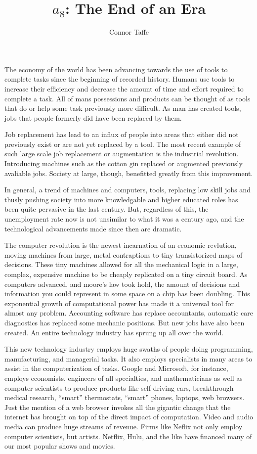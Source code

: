 \documentclass{amsart}
\title{$a_{8}$: The End of an Era}
\author{Connor Taffe}
\begin{document}
  \maketitle

  The economy of the world has been advancing towards the use of tools to complete tasks since the beginning of recorded history. Humans use tools to increase their efficiency and decrease the amount of time and effort required to complete a task. All of mans possessions and products can be thought of as tools that do or help some task previously more difficult. As man has created tools, jobs that people formerly did have been replaced by them.

  Job replacement has lead to an influx of people into areas that either did not previously exist or are not yet replaced by a tool. The most recent example of such large scale job replacement or augmentation is the industrial revolution. Introducing machines such as the cotton gin replaced or augmented previously avaliable jobs. Society at large, though, benefitted greatly from this improvement.

  In general, a trend of machines and computers, tools, replacing low skill jobs and thusly pushing society into more knowledgable and higher educated roles has been quite pervasive in the last century. But, regardless of this, the unemployment rate now is not unsimilar to what it was a century ago, and the technological advancements made since then are dramatic.

  The computer revolution is the newest incarnation of an economic revlution, moving machines from large, metal contraptions to tiny transistorized maps of decisions. These tiny machines allowed for all the mechanical logic in a large, complex, expensive machine to be cheaply replicated on a tiny circuit board. As computers advanced, and moore's law took hold, the amount of decisions and information you could represent in some space on a chip has been doubling. This exponential growth of computational power has made it a universal tool for almost any problem. Accounting software has replace accountants, automatic care diagnostics has replaced some mechanic positions. But new jobs have also been created. An entire technology industry has sprung up all over the world.

  This new technology industry employs huge swaths of people doing programming, manufacturing, and managerial tasks. It also employs specialists in many areas to assist in the computerization of tasks. Google and Microsoft, for instance, employs economists, engineers of all specialties, and mathematicians as well as computer scientists to produce products like self-driving cars, breakthrough medical research, ``smart'' thermostats, ``smart'' phones, laptops, web browsers. Just the mention of a web browser invokes all the gigantic change that the internet has brought on top of the direct impact of computation. Video and audio media can produce huge streams of revenue. Firms like Neflix not only employ computer scientists, but artists. Netflix, Hulu, and the like have financed many of our most popular shows and movies.
\end{document}
